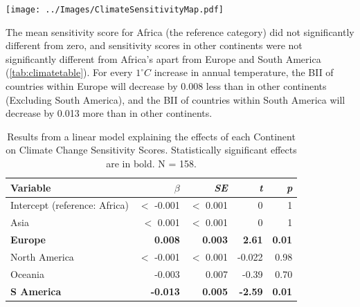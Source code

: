 \documentclass[11pt, a4paper, titlepage]{article}
\begin{document}
	\begin{minipage}{\textwidth}
	\centering
		\texttt{[image: ../Images/ClimateSensitivityMap.pdf]}
		\label{figure:climatemap}
	\end{minipage}
	\newpage
	The mean sensitivity score for Africa (the reference category) did not significantly different from zero, and sensitivity scores in other continents were not significantly different from Africa's apart from Europe and South America (\autoref{tab:climatetable}). For every $1^\circ C$ increase in annual temperature, the BII of countries within Europe will decrease by 0.008 less than in other continents (Excluding South America), and the BII of countries within South America will decrease by 0.013 more than in other continents.
	
	\begin{table}[H]
		\begin{center}
			\caption{Results from a linear model explaining the effects of each Continent on Climate Change Sensitivity Scores. \textmd{Statistically significant effects are in bold. N = 158.}}
			\label{tab:climatetable}
			\begin{tabular}{l|r|r|r|r}
				Variable & $\beta$ & \textit{SE} & \textit{t} & \textit{p}\\
				\hline
				Intercept (reference: Africa) & $<$ -0.001 & $<$ 0.001 & 0 & 1\\
				Asia & $<$ 0.001 & $<$ 0.001& 0 & 1\\
				\textbf{Europe} & \textbf{0.008} & \textbf{0.003} & \textbf{2.61} & \textbf{0.01} \\
				North America & $<$ -0.001 & $<$ 0.001 & -0.022 & 0.98\\
				Oceania & -0.003 & 0.007 & -0.39 & 0.70\\
				\textbf{S America} & \textbf{-0.013} & \textbf{0.005} & \textbf{-2.59} & \textbf{0.01}\\
			\end{tabular}
		\end{center}
	\end{table}
	\bigskip
\end{document}
